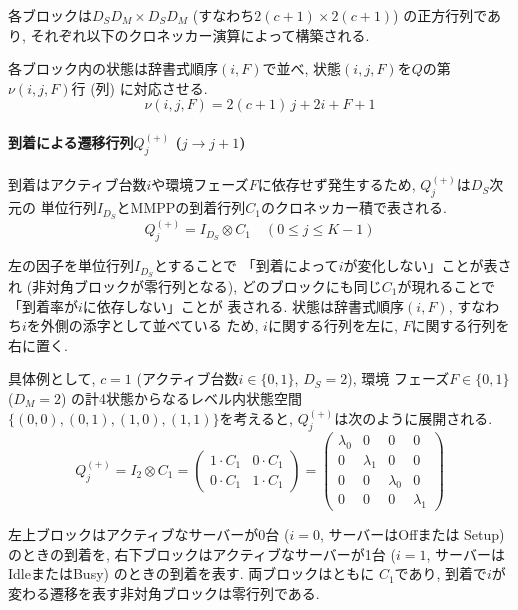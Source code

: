 \documentclass[a4paper, 11pt, dvipdfmx]{jsreport}
\begin{document}
各ブロックは$D_S D_M \times D_S D_M$ (すなわち$2(c+1) \times 2(c+1)$)
の正方行列であり, それぞれ以下のクロネッカー演算によって構築される. 

各ブロック内の状態は辞書式順序$(i, F)$で並べ, 状態$(i, j, F)$を$Q$の第$\nu(i, j, F)$行 (列) に対応させる.
\begin{equation}
    \nu(i, j, F) = 2(c+1)\, j + 2i + F + 1
    \label{eq:state-index}
\end{equation}

\paragraph{到着による遷移行列$Q^{(+)}_j$ ($j \to j+1$)}
\label{sec:q-plus}

到着はアクティブ台数$i$や環境フェーズ$F$に依存せず発生するため, $Q^{(+)}_j$は$D_S$次元の
単位行列$I_{D_S}$とMMPPの到着行列$C_1$のクロネッカー積で表される. 
\begin{equation}
    Q^{(+)}_{j} = I_{D_S} \otimes C_1 \quad (0 \le j \le K-1)
\end{equation}

左の因子を単位行列$I_{D_S}$とすることで
「到着によって$i$が変化しない」ことが表され (非対角ブロックが零行列となる), 
どのブロックにも同じ$C_1$が現れることで「到着率が$i$に依存しない」ことが
表される. 状態は辞書式順序$(i, F)$, すなわち$i$を外側の添字として並べている
ため, $i$に関する行列を左に, $F$に関する行列を右に置く. 

具体例として, $c=1$ (アクティブ台数$i \in \{0, 1\}$, $D_S=2$), 環境
フェーズ$F \in \{0, 1\}$ ($D_M=2$) の計4状態からなるレベル内状態空間
$\{(0, 0), (0, 1), (1, 0), (1, 1)\}$を考えると, $Q_j^{(+)}$は次のように展開される. 
\begin{equation}
Q_j^{(+)} = I_2 \otimes C_1 =
\begin{pmatrix}
1 \cdot C_1 & 0 \cdot C_1 \\
0 \cdot C_1 & 1 \cdot C_1
\end{pmatrix}
=
\begin{pmatrix}
\lambda_0 & 0 & 0 & 0 \\
0 & \lambda_1 & 0 & 0 \\
0 & 0 & \lambda_0 & 0 \\
0 & 0 & 0 & \lambda_1
\end{pmatrix}
\label{eq:kronecker_example_q_plus}
\end{equation}

左上ブロックはアクティブなサーバーが0台 ($i=0$, サーバーはOffまたは
Setup) のときの到着を, 右下ブロックはアクティブなサーバーが1台
($i=1$, サーバーはIdleまたはBusy) のときの到着を表す. 両ブロックはともに
$C_1$であり, 到着で$i$が変わる遷移を表す非対角ブロックは零行列である. 
\end{document}
